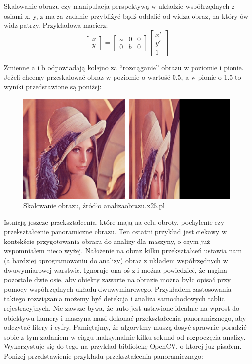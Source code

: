 \documentclass{article}
\begin{document}
	\par
	Skalowanie obrazu czy manipulacja perspektywą w układzie współrzędnych z osiami x, y, z ma za zadanie przybliżyć bądź oddalić od widza obraz, na który ów widz patrzy. Przykładowa macierz:
	\[
	\begin{bmatrix}
		x\\
		y
	\end{bmatrix}
	=
	\begin{bmatrix}
		a & 0 & 0\\
		0 & b & 0
	\end{bmatrix}
	\begin{bmatrix}
		x'\\
		y'\\
		1
	\end{bmatrix}
	\]
	\par
	Zmienne a i b odpowiadają kolejno za “rozciąganie” obrazu w poziomie i pionie. Jeżeli chcemy przeskalować obraz w poziomie o wartość 0.5, a w pionie o 1.5 to wyniki przedstawione są poniżej:
	\begin{figure}
		\centering
		\includegraphics[width=15cm]{scale}
		\caption{Skalowanie obrazu, źródło analizaobrazu.x25.pl}
	\end{figure}
	\par
	Istnieją jeszcze przekształcenia, które mają na celu obroty, pochylenie czy przekształcenie panoramiczne obrazu. Ten ostatni przykład jest ciekawy w kontekście przygotowania obrazu do analizy dla maszyny, o czym już wspomniałem nieco wyżej. Nałożenie na obraz kilku przekształceń ustawia nam (a bardziej oprogramowaniu do analizy) obraz z układem współrzędnych w dwuwymiarowej warstwie. Ignoruje ona oś z i można powiedzieć, że nagina pozostałe dwie osie, aby obiekty zawarte na obrazie można było opisać przy pomocy współrzędnych układu dwuwymiarowego. Przykładem zastosowania takiego rozwiązania możemy być detekcja i analiza samochodowych tablic rejestracyjnych. Nie zawsze bywa, że auto jest ustawione idealnie na wprost do obiektywu kamery i maszyna musi dokonać przekształcenia panoramicznego, aby odczytać litery i cyfry. Pamiętajmy, że algorytmy muszą dosyć sprawnie poradzić sobie z tym zadaniem w ciągu maksymalnie kilku sekund od rozpoczęcia analizy. Wykorzystuje się do tego na przykład bibliotekę OpenCV, o której już pisałem. Poniżej przedstawienie przykładu przekształcenia panoramicznego:
\end{document}
